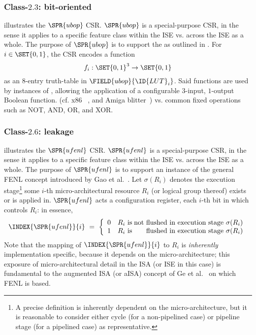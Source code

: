 
\subsubsection{Class-$2.3$: bit-oriented}
\label{sec:spec:state:2:3}

illustrates the 
$\SPR{ubop}$
CSR.
$\SPR{ubop}$
is a special-purpose CSR, in the sense it applies 
to a specific feature class within the ISE
vs.
across the ISE as a whole.
The purpose of 
$\SPR{ubop}$
is to support the
as outlined in 
.
For $i \in \SET{ 0, 1 }$, the CSR encodes a function
\[
f_i : \SET{ 0, 1 }^3 \rightarrow \SET{ 0, 1 }
\]
as an $8$-entry truth-table in $\FIELD{ubop}{\ID{LUT}_{i}}$.
Said functions are used by instances of , allowing the
application of a configurable $3$-input, $1$-output Boolean function.
(cf. x86 ~\cite[5-446--5-468]{SCARV:X86:2:18}, and Amiga blitter~\cite[Chapter 6]{SCARV:Amiga:85})
vs. common fixed operations such as NOT, AND, OR, and XOR.


\subsubsection{Class-$2.6$: leakage}
\label{sec:spec:state:2:6}

illustrates the 
$\SPR{ufenl}$
CSR.
$\SPR{ufenl}$
is a special-purpose CSR, in the sense it applies 
to a specific feature class within the ISE
vs.
across the ISE as a whole.
The purpose of 
$\SPR{ufenl}$
is to support an instance of the general FENL concept introduced by 
Gao et al.~\cite{SCARV:GMPP:20}.
Let
$
\sigma( R_i )
$
denotes the execution stage\footnote{%
A precise definition is inherently dependent on the micro-architecture, but
it is reasonable to consider either
cycle          (for a non-pipelined case)
or
pipeline stage (for a     pipelined case)
as representative.
} some $i$-th micro-architectural resource $R_i$ (or logical group 
thereof) exists or is applied in.
$\SPR{ufenl}$
acts a configuration register, each $i$-th bit in which controls $R_i$: in
essence, 
\[
\INDEX{\SPR{ufenl}}{i} ~=~ \left\{\begin{array}{ll@{\;}r}
                                  0 & \mbox{$R_i$ is} & \mbox{not flushed in execution stage $\sigma( R_i )$} \\
                                  1 & \mbox{$R_i$ is} & \mbox{    flushed in execution stage $\sigma( R_i )$} \\
                                  \end{array}
                             \right.
\]
Note that the mapping of 
$\INDEX{\SPR{ufenl}}{i}$
to 
$R_i$
is {\em inherently} implementation specific, because it depends on the
micro-architecture; this exposure of micro-architectural detail in the
ISA (or ISE in this case) is fundamental to the augmented ISA (or aISA) 
concept of
Ge et al.~\cite{SCARV:GeYarHei:18}
on which FENL is based.

